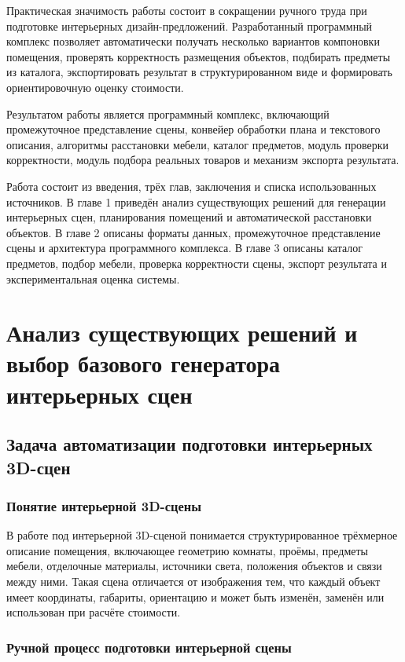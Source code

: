 \documentclass[times]{itmo-student-thesis}
\begin{document}
Практическая значимость работы состоит в сокращении ручного труда при подготовке интерьерных дизайн-предложений. Разработанный программный комплекс позволяет автоматически получать несколько вариантов компоновки помещения, проверять корректность размещения объектов, подбирать предметы из каталога, экспортировать результат в структурированном виде и формировать ориентировочную оценку стоимости.

Результатом работы является программный комплекс, включающий промежуточное представление сцены, конвейер обработки плана и текстового описания, алгоритмы расстановки мебели, каталог предметов, модуль проверки корректности, модуль подбора реальных товаров и механизм экспорта результата.

Работа состоит из введения, трёх глав, заключения и списка использованных источников. В главе 1 приведён анализ существующих решений для генерации интерьерных сцен, планирования помещений и автоматической расстановки объектов. В главе 2 описаны форматы данных, промежуточное представление сцены и архитектура программного комплекса. В главе 3 описаны каталог предметов, подбор мебели, проверка корректности сцены, экспорт результата и экспериментальная оценка системы.

\chapter{Анализ существующих решений и выбор базового генератора интерьерных сцен}

\section{Задача автоматизации подготовки интерьерных 3D-сцен}

\subsection{Понятие интерьерной 3D-сцены}

В работе под интерьерной 3D-сценой понимается структурированное трёхмерное описание помещения, включающее геометрию комнаты, проёмы, предметы мебели, отделочные материалы, источники света, положения объектов и связи между ними. Такая сцена отличается от изображения тем, что каждый объект имеет координаты, габариты, ориентацию и может быть изменён, заменён или использован при расчёте стоимости.

\subsection{Ручной процесс подготовки интерьерной сцены}
\end{document}
